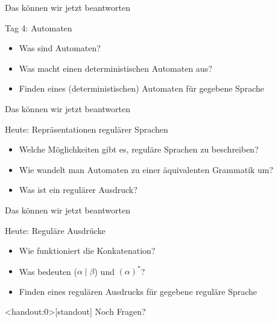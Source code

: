 \begin{frame}[fragile]{Das können wir jetzt beantworten}
  \begin{alertblock}{Tag 4: Automaten}
    \begin{itemize}
      \item Was sind Automaten?
      \item Was macht einen deterministischen Automaten aus?
      \item Finden eines (deterministischen) Automaten für gegebene Sprache
    \end{itemize}
  \end{alertblock}
\end{frame}

\begin{frame}[fragile]{Das können wir jetzt beantworten}
  \begin{alertblock}{Heute: Repräsentationen regulärer Sprachen}
    \begin{itemize}
      \item Welche Möglichkeiten gibt es, reguläre Sprachen zu beschreiben?
      \item Wie wandelt man Automaten zu einer äquivalenten Grammatik um?
      \item Was ist ein regulärer Ausdruck?
    \end{itemize}
  \end{alertblock}
\end{frame}

\begin{frame}[fragile]{Das können wir jetzt beantworten}
  \begin{alertblock}{Heute: Reguläre Ausdrücke}
    \begin{itemize}
      \item Wie funktioniert die Konkatenation?
      \item Was bedeuten ($\alpha \mid \beta$) und $(\alpha)^*$?
      \item Finden eines regulären Ausdrucks für gegebene reguläre Sprache
    \end{itemize}
  \end{alertblock}
\end{frame}

\begin{frame}<handout:0>[standout]
  Noch Fragen?
\end{frame}

